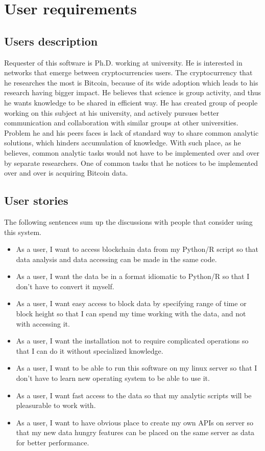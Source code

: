 \documentclass[12pt, en, eng, oneside]{mgr}
\begin{document}
\section{User requirements}

\subsection{Users description}

Requester of this software is Ph.D. working at university. He is interested in networks that emerge between cryptocurrencies users. The cryptocurrency that he researches the most is Bitcoin, because of its wide adoption which leads to his research having bigger impact. He believes that science is group activity, and thus he wants knowledge to be shared in efficient way. He has created group of people working on this subject at his university, and actively pursues better communication and collaboration with similar groups at other universities. Problem he and his peers faces is lack of standard way to share common analytic solutions, which hinders accumulation of knowledge. With such place, as he believes, common analytic tasks would not have to be implemented over and over by separate researchers. One of common tasks that he notices to be implemented over and over is acquiring Bitcoin data.  

\subsection{User stories}

The following sentences sum up the discussions with people that consider using this system.

\begin{itemize}
\item
As a user, I want to access blockchain data from my Python/R script so that data analysis and data accessing can be made in the same code.
\item
As a user, I want the data be in a format idiomatic to Python/R so that I don't have to convert it myself.
\item
As a user, I want easy access to block data by specifying range of time or block height so that I can spend my time working with the data, and not with accessing it.
\item
As a user, I want the installation not to require complicated operations so that I can do it without specialized knowledge.
\item
As a user, I want to be able to run this software on my linux server so that I don't have to learn new operating system to be able to use it.
\item
As a user, I want fast access to the data so that my analytic scripts will be pleasurable to work with.
\item
As a user, I want to have obvious place to create my own APIs on server so that my new data hungry features can be placed on the same server as data for better performance.
\end{itemize}
\end{document}
